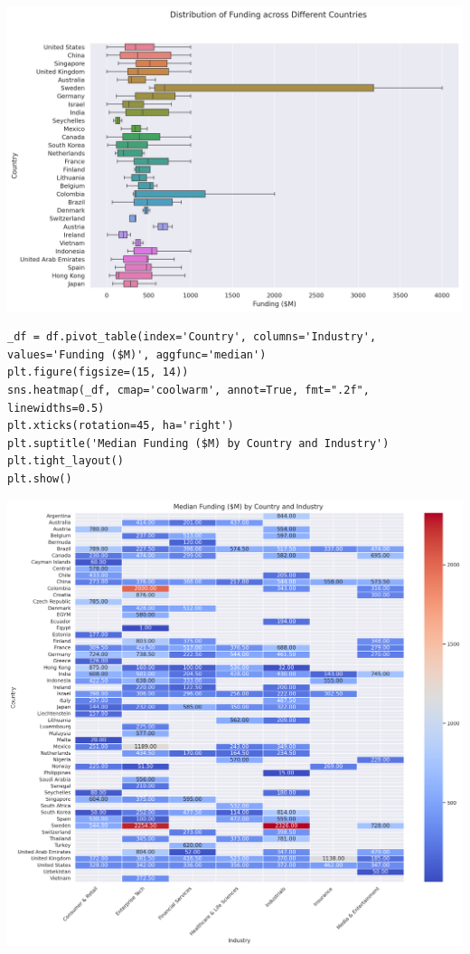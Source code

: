 \documentclass[a4paper,12pt]{article}
\begin{document}
\begin{center}
\includegraphics[width=.9\linewidth]{./.ob-jupyter/fa05f2e0e7dfc6eb42b967ec12db60330b88785b.png}
\label{}
\end{center}

\begin{verbatim}
_df = df.pivot_table(index='Country', columns='Industry', values='Funding ($M)', aggfunc='median')
plt.figure(figsize=(15, 14))
sns.heatmap(_df, cmap='coolwarm', annot=True, fmt=".2f", linewidths=0.5)
plt.xticks(rotation=45, ha='right')
plt.suptitle('Median Funding ($M) by Country and Industry')
plt.tight_layout()
plt.show()
\end{verbatim}

\begin{center}
\includegraphics[width=.9\linewidth]{./.ob-jupyter/1fae544818601e487320f474cee01e7e7688ed42.png}
\label{}
\end{center}
\end{document}
